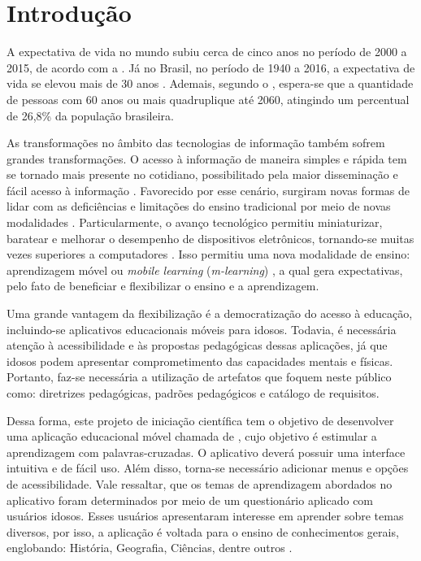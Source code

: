 \chapter{Introdução}
A expectativa de vida no mundo subiu cerca de cinco anos no período de 2000 a 2015, de acordo com a \cite{world2016world}. Já no Brasil, no período de 1940 a 2016, a expectativa de vida se elevou mais de 30 anos \citep{expectativabrasileiros}. Ademais, segundo o \cite{demografico2010disponivel}, espera-se que a quantidade de pessoas com 60 anos ou mais quadruplique até 2060, atingindo um percentual de 26,8\% da população brasileira.

As transformações no âmbito das tecnologias de informação também sofrem grandes transformações. O acesso à informação de maneira simples e rápida tem se tornado mais presente no cotidiano, possibilitado pela maior disseminação e fácil acesso à informação \citep{Grossi2014}. Favorecido por esse cenário, surgiram novas formas de lidar com as deficiências e limitações do ensino tradicional por meio de novas modalidades \citep{Behrens2005}. Particularmente, o avanço tecnológico permitiu miniaturizar, baratear e melhorar o desempenho de dispositivos eletrônicos, tornando-se muitas vezes superiores a computadores \citep{Zamfirache2013}. Isso permitiu uma nova modalidade de ensino: aprendizagem móvel ou \textit{mobile learning} (\textit{m-learning}) \citep{Crompton2013, Keegan2005, Traxler2006, Wu2012}, a qual gera expectativas, pelo fato de beneficiar e flexibilizar o ensino e a aprendizagem.

Uma grande vantagem da flexibilização é a democratização do acesso à educação, incluindo-se aplicativos educacionais móveis para idosos. Todavia, é necessária atenção à acessibilidade e às propostas pedagógicas dessas aplicações, já que idosos podem apresentar comprometimento das capacidades mentais e físicas. Portanto, faz-se necessária a utilização de artefatos que foquem neste público como: diretrizes pedagógicas, padrões pedagógicos e catálogo de requisitos.

Dessa forma, este projeto de iniciação científica tem o objetivo de desenvolver uma aplicação educacional móvel chamada de \crossword, cujo objetivo é estimular a aprendizagem com palavras-cruzadas. O aplicativo deverá possuir uma interface intuitiva e de fácil uso. Além disso, torna-se necessário adicionar menus e opções de acessibilidade. Vale ressaltar, que os temas de aprendizagem abordados no aplicativo foram determinados por meio de um questionário aplicado com usuários idosos. Esses usuários apresentaram interesse em aprender sobre temas diversos, por isso, a aplicação é voltada para o ensino de conhecimentos gerais, englobando: História, Geografia, Ciências, dentre outros \citep{oliveira2018crossword}. 

